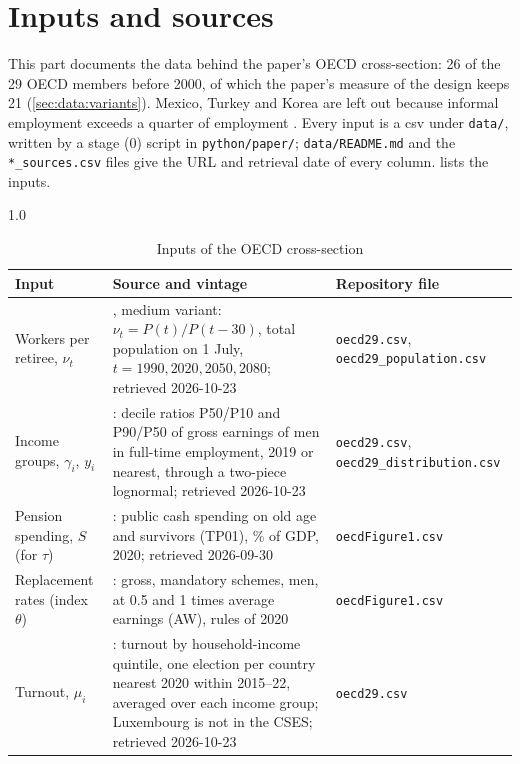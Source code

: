 \section{Inputs and sources}\label{sec:data:inputs}
This part documents the data behind the paper's OECD cross-section: 26 of the 29 OECD members before 2000, of which the paper's measure of the design keeps 21 (\cref{sec:data:variants}). Mexico, Turkey and Korea are left out because informal employment exceeds a quarter of employment \parencite{ILOSTAT}. Every input is a csv under \texttt{data/}, written by a stage (0) script in \texttt{python/paper/}; \texttt{data/README.md} and the \texttt{*\_sources.csv} files give the URL and retrieval date of every column.  lists the inputs.

\begin{table}[htbp]
\centering
\caption{Inputs of the OECD cross-section}\label{tab:data:inputs}
\begin{spacing}{1.0}
\footnotesize
\begin{tabular}{@{}>{\raggedright\arraybackslash}p{2.6cm}>{\raggedright\arraybackslash}p{\dimexpr\linewidth-6.2cm-4\tabcolsep\relax}>{\raggedright\arraybackslash}p{3.6cm}@{}}
\toprule
Input & Source and vintage & Repository file \\
\midrule
Workers per retiree, $\nu_t$ & \textcite{UN_WPP2024}, medium variant: $\nu_t = P(t)/P(t-30)$, total population on 1 July, $t = 1990, 2020, 2050, 2080$; retrieved 2026-10-23 & \texttt{oecd29.csv}, \texttt{oecd29\_population.csv} \\
Income groups, $\gamma_i$, $y_i$ & \textcite{OECD_Earnings}: decile ratios P50/P10 and P90/P50 of gross earnings of men in full-time employment, 2019 or nearest, through a two-piece lognormal; retrieved 2026-10-23 & \texttt{oecd29.csv}, \texttt{oecd29\_distribution.csv} \\
Pension spending, $S$ (for $\tau$) & \textcite{OECD_SOCX}: public cash spending on old age and survivors (TP01), \% of GDP, 2020; retrieved 2026-09-30 & \texttt{oecdFigure1.csv} \\
Replacement rates (index $\theta$) & \textcite[table 4.1]{OECD_PaG2021}: gross, mandatory schemes, men, at 0.5 and 1 times average earnings (AW), rules of 2020 & \texttt{oecdFigure1.csv} \\
Turnout, $\mu_i$ & \textcite{CSES}: turnout by household-income quintile, one election per country nearest 2020 within 2015--22, averaged over each income group; Luxembourg is not in the CSES; retrieved 2026-10-23 & \texttt{oecd29.csv} \\

\end{tabular}
\end{spacing}
\end{table}

